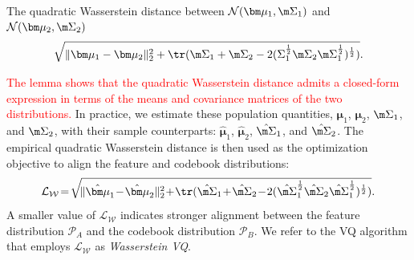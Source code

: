 \begin{lemma}\label{theorem:Wasserstein Distance}
The quadratic Wasserstein distance between $\mathcal{N}(\bm \mu_1, \m \Sigma_1)$ and $\mathcal{N}(\bm \mu_2, \m \Sigma_2)$ 
\begin{equation}\label{eq:wasserstein distance definition}
\sqrt{\Vert \bm \mu_1 - \bm \mu_2 \Vert^2_2 + \tr( {\m \Sigma_1}+ {\m \Sigma_2} - 2 (\Sigma_1^{\frac{1}{2}} {\m \Sigma_2} \m \Sigma_1^{\frac{1}{2}})^{\frac{1}{2}})}.
\end{equation}
\end{lemma}
\textcolor{red}{The lemma shows that the quadratic Wasserstein distance admits a closed-form expression in terms of the means and covariance matrices of the two distributions.
}
In practice, we estimate these population quantities, ${\bm \mu}_{1}$, ${\bm \mu}_{2}$, ${\m \Sigma}_{1}$, and ${\m \Sigma}_{2}$, with their sample counterparts: $\hat {\bm \mu}_{1}$, $\hat {\bm \mu}_{2}$, $\hat {\m \Sigma}_{1}$, and $\hat {\m \Sigma}_{2}$. 
The empirical quadratic Wasserstein distance is then used as the optimization objective to align  the feature and codebook distributions:
\begin{equation}\label{eq:wasserstein distance}
\mathcal{L}_{\mathcal{W}}\! = \!\sqrt{\!\Vert \hat {\bm \mu}_{1} \!- \!\hat {\bm \mu}_{2} \Vert^2_2 \!+\! \tr( \hat {\m \Sigma}_{1}\!+\!\hat {\m \Sigma}_{2}\! -\!2(\hat {\m \Sigma}_{1}^{\frac{1}{2}} {\hat {\m \Sigma}_{2}} \hat {\m \Sigma}_{1}^{\frac{1}{2}})^{\frac{1}{2}})}. \nonumber
\end{equation}  
A smaller value of $\mathcal{L}_{\mathcal{W}}$ indicates stronger alignment  between the feature distribution $\mathcal{P}_A$ and the codebook  distribution $\mathcal{P}_B$. We refer to the VQ algorithm that employs $\mathcal{L}_{\mathcal{W}}$ as \emph{Wasserstein VQ}.

